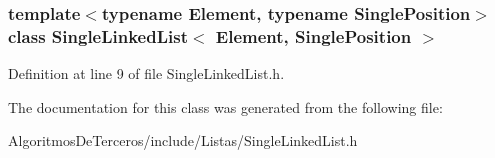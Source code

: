 \subsubsection*{template$<$typename Element, typename Single\+Position$>$\newline
class Single\+Linked\+List$<$ Element, Single\+Position $>$}



Definition at line 9 of file Single\+Linked\+List.\+h.



The documentation for this class was generated from the following file\+:\begin{DoxyCompactItemize}
\item 
Algoritmos\+De\+Terceros/include/\+Listas/Single\+Linked\+List.\+h\end{DoxyCompactItemize}
